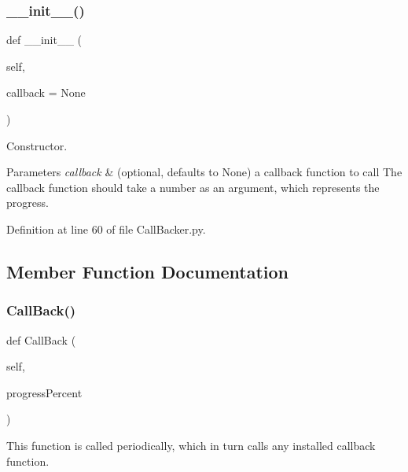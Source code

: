 \subsubsection{\texorpdfstring{\+\_\+\+\_\+init\+\_\+\+\_\+()}{\_\_init\_\_()}}
{\footnotesize\ttfamily def \+\_\+\+\_\+init\+\_\+\+\_\+ (\begin{DoxyParamCaption}\item[{}]{self,  }\item[{}]{callback = {\ttfamily None} }\end{DoxyParamCaption})}



Constructor. 


\begin{DoxyParams}{Parameters}
{\em callback} & (optional, defaults to None) a callback function to call The callback function should take a number as an argument, which represents the progress. \\
\hline
\end{DoxyParams}


Definition at line 60 of file Call\+Backer.\+py.



\subsection{Member Function Documentation}
\mbox{\label{classSignalIntegrity_1_1CallBacker_1_1CallBacker_ad1aebee41f7b067b9fc11c28f87b27ba}} 
\subsubsection{\texorpdfstring{Call\+Back()}{CallBack()}}
{\footnotesize\ttfamily def Call\+Back (\begin{DoxyParamCaption}\item[{}]{self,  }\item[{}]{progress\+Percent }\end{DoxyParamCaption})}



This function is called periodically, which in turn calls any installed callback function. 


